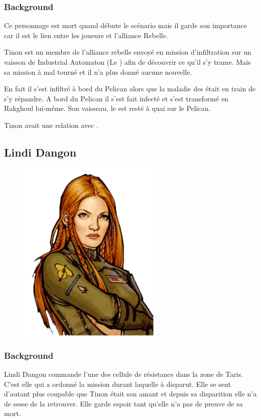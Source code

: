 \subsubsection{Background}
Ce personnage est mort quand débute le scénario mais il garde son importance car il est le lien entre les joueurs et l'alliance Rebelle.

Tinon est un membre de l'alliance rebelle envoyé en mission d'infiltration sur un vaisson de Industrial Automaton (Le ) afin de découvrir ce qu'il s'y trame. Mais sa mission à mal tourné et il n'a plus donné aucune nouvelle. 

En fait il s'est infiltré à bord du Pelican alors que la maladie des  était en train de s'y répandre. A bord du Pelican il s'est fait infecté et s'est transformé en Rakghoul lui-même. Son vaisseau, le  est resté à quai sur le Pelican.

Tinon avait une relation avec .

\newpage
\subsection{Lindi Dangon} \label{sec:lindi-dangon}
\begin{figure}[h!]
    \centering
    \includegraphics[height=250pt]{_img/pnjs/lindi-dangon.png}
\end{figure}
\subsubsection{Background}
Lindi Dangon commande l'une des cellule de résistance dans la zone de Taris. C'est elle qui a ordonné la mission durant laquelle  à disparut. Elle se sent d'autant plus coupable que Tinon était son amant et depuis sa disparition elle n'a de sesse de la retrouver. Elle garde espoir tant qu'elle n'a pas de preuve de sa mort.

